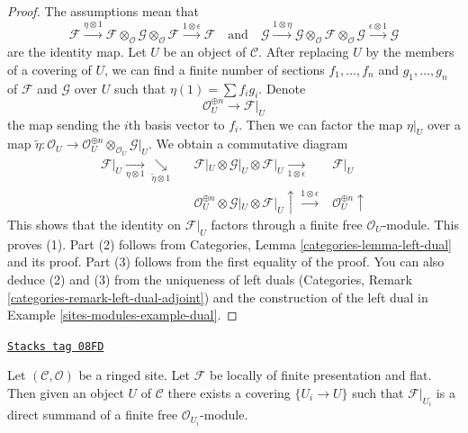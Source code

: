 \begin{proof}
The assumptions mean that
$$
\mathcal{F} \xrightarrow{\eta \otimes 1}
\mathcal{F} \otimes_\mathcal{O} \mathcal{G}
\otimes_\mathcal{O} \mathcal{F}
\xrightarrow{1 \otimes \epsilon} \mathcal{F}
\quad\text{and}\quad
\mathcal{G} \xrightarrow{1 \otimes \eta}
\mathcal{G} \otimes_\mathcal{O} \mathcal{F}
\otimes_\mathcal{O} \mathcal{G}
\xrightarrow{\epsilon \otimes 1} \mathcal{G}
$$
are the identity map. Let $U$ be an object of $\mathcal{C}$.
After replacing $U$ by the members of a covering of $U$,
we can find a finite number of sections $f_1, \ldots, f_n$
and $g_1, \ldots, g_n$ of
$\mathcal{F}$ and $\mathcal{G}$ over $U$ such that
$\eta(1) = \sum f_i g_i$. Denote
$$
\mathcal{O}_U^{\oplus n} \to \mathcal{F}|_U
$$
the map sending the $i$th basis vector to $f_i$. Then we
can factor the map $\eta|_U$ over a map
$\tilde \eta : \mathcal{O}_U \to
\mathcal{O}_U^{\oplus n} \otimes_{\mathcal{O}_U} \mathcal{G}|_U$.
We obtain a commutative diagram
$$
\begin{array}{cccc}\mathcal{F}|_U
\underset{\eta \otimes 1}{\longrightarrow}\underset{\tilde \eta \otimes 1}{\searrow} &  & \mathcal{F}|_U \otimes \mathcal{G}|_U \otimes \mathcal{F}|_U
\underset{1 \otimes \epsilon}{\longrightarrow} & \mathcal{F}|_U \\  &  & \mathcal{O}_U^{\oplus n} \otimes \mathcal{G}|_U \otimes \mathcal{F}|_U
\uparrow\overset{1 \otimes \epsilon}{\longrightarrow} & \mathcal{O}_U^{\oplus n} \uparrow\end{array}
$$
This shows that the identity on $\mathcal{F}|_U$
factors through a finite free $\mathcal{O}_U$-module.
This proves (1). Part (2) follows from
Categories, Lemma \ref{categories-lemma-left-dual} and its proof.
Part (3) follows from the first equality of the proof.
You can also deduce (2) and (3) from the uniqueness of left duals
(Categories, Remark \ref{categories-remark-left-dual-adjoint})
and the construction of the left dual in
Example \ref{sites-modules-example-dual}.
\end{proof}

\begin{lemma}
\label{sites-modules-lemma-flat-locally-finite-presentation}
\href{https://stacks.math.columbia.edu/tag/08FD}{\texttt{Stacks tag 08FD}}

Let $(\mathcal{C}, \mathcal{O})$ be a ringed site. Let $\mathcal{F}$
be locally of finite presentation and flat. Then given an object
$U$ of $\mathcal{C}$ there exists a covering $\{U_i \to U\}$ such that
$\mathcal{F}|_{U_i}$ is a direct summand of a finite free
$\mathcal{O}_{U_i}$-module.
\end{lemma}

